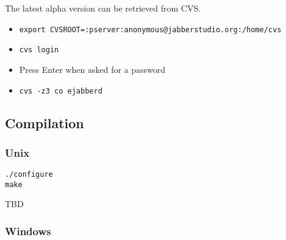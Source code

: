 \documentclass[10pt]{article}
\begin{document}
The latest alpha version can be retrieved from CVS\@.
\begin{itemize}
\item \texttt{export CVSROOT=:pserver:anonymous@jabberstudio.org:/home/cvs}
\item \texttt{cvs login}
\item Press Enter when asked for a password
\item \texttt{cvs -z3 co ejabberd}
\end{itemize}



\subsection{Compilation}
\label{sec:compilation}
\subsubsection{Unix}
\label{sec:compilationunix}

\begin{verbatim}
./configure
make
\end{verbatim}

TBD

\subsubsection{Windows}
\label{sec:compilationwin}
\end{document}
